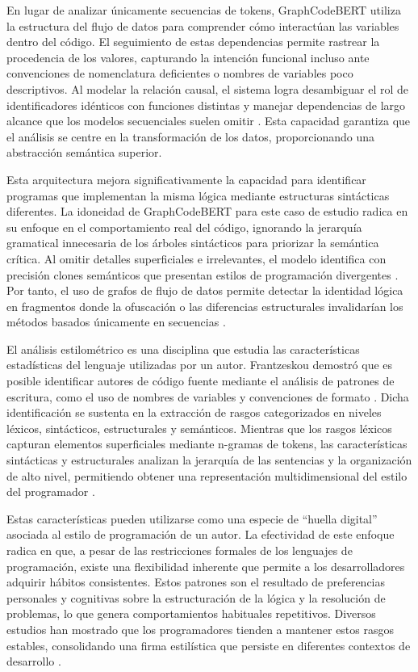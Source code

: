 En lugar de analizar únicamente secuencias de tokens, GraphCodeBERT utiliza la estructura del flujo de datos para comprender cómo interactúan las variables dentro del código. El seguimiento de estas dependencias permite rastrear la procedencia de los valores, capturando la intención funcional incluso ante convenciones de nomenclatura deficientes o nombres de variables poco descriptivos. Al modelar la relación causal, el sistema logra desambiguar el rol de identificadores idénticos con funciones distintas y manejar dependencias de largo alcance que los modelos secuenciales suelen omitir \cite{Guo2021GraphCodeBERT}. Esta capacidad garantiza que el análisis se centre en la transformación de los datos, proporcionando una abstracción semántica superior.

Esta arquitectura mejora significativamente la capacidad para identificar programas que implementan la misma lógica mediante estructuras sintácticas diferentes. La idoneidad de GraphCodeBERT para este caso de estudio radica en su enfoque en el comportamiento real del código, ignorando la jerarquía gramatical innecesaria de los árboles sintácticos para priorizar la semántica crítica. Al omitir detalles superficiales e irrelevantes, el modelo identifica con precisión clones semánticos que presentan estilos de programación divergentes \cite{Guo2021GraphCodeBERT, MartinezGil2025Interpretability}. Por tanto, el uso de grafos de flujo de datos permite detectar la identidad lógica en fragmentos donde la ofuscación o las diferencias estructurales invalidarían los métodos basados únicamente en secuencias \cite{MartinezGil2025Interpretability}.

El análisis estilométrico es una disciplina que estudia las características estadísticas del lenguaje utilizadas por un autor. Frantzeskou demostró que es posible identificar autores de código fuente mediante el análisis de patrones de escritura, como el uso de nombres de variables y convenciones de formato \cite{Frantzeskou2006Source}. Dicha identificación se sustenta en la extracción de rasgos categorizados en niveles léxicos, sintácticos, estructurales y semánticos. Mientras que los rasgos léxicos capturan elementos superficiales mediante n-gramas de tokens, las características sintácticas y estructurales analizan la jerarquía de las sentencias y la organización de alto nivel, permitiendo obtener una representación multidimensional del estilo del programador \cite{Frantzeskou2006Source, Horvath2026ProgrammerAttribution}.

Estas características pueden utilizarse como una especie de “huella digital” asociada al estilo de programación de un autor. La efectividad de este enfoque radica en que, a pesar de las restricciones formales de los lenguajes de programación, existe una flexibilidad inherente que permite a los desarrolladores adquirir hábitos consistentes. Estos patrones son el resultado de preferencias personales y cognitivas sobre la estructuración de la lógica y la resolución de problemas, lo que genera comportamientos habituales repetitivos. Diversos estudios han mostrado que los programadores tienden a mantener estos rasgos estables, consolidando una firma estilística que persiste en diferentes contextos de desarrollo \cite{Horvath2026ProgrammerAttribution}.

